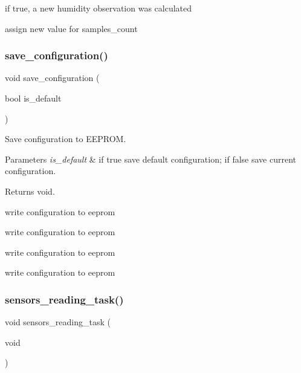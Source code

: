 if true, a new humidity observation was calculated

assign new value for samples\+\_\+count \mbox{\label{i2c-th_8h_a8801fa7c9f323c5b8b9b2bb5b1c438ff}} 
\subsubsection{\texorpdfstring{save\+\_\+configuration()}{save\_configuration()}}
{\footnotesize\ttfamily void save\+\_\+configuration (\begin{DoxyParamCaption}\item[{bool}]{is\+\_\+default }\end{DoxyParamCaption})}



Save configuration to E\+E\+P\+R\+OM. 


\begin{DoxyParams}{Parameters}
{\em is\+\_\+default} & if true save default configuration; if false save current configuration. \\
\hline
\end{DoxyParams}
\begin{DoxyReturn}{Returns}
void. 
\end{DoxyReturn}
write configuration to eeprom

write configuration to eeprom

write configuration to eeprom

write configuration to eeprom \mbox{\label{i2c-th_8h_af0e8965583b124096972fe3a9e0e7954}} 
\subsubsection{\texorpdfstring{sensors\+\_\+reading\+\_\+task()}{sensors\_reading\_task()}}
{\footnotesize\ttfamily void sensors\+\_\+reading\+\_\+task (\begin{DoxyParamCaption}\item[{void}]{ }\end{DoxyParamCaption})}



